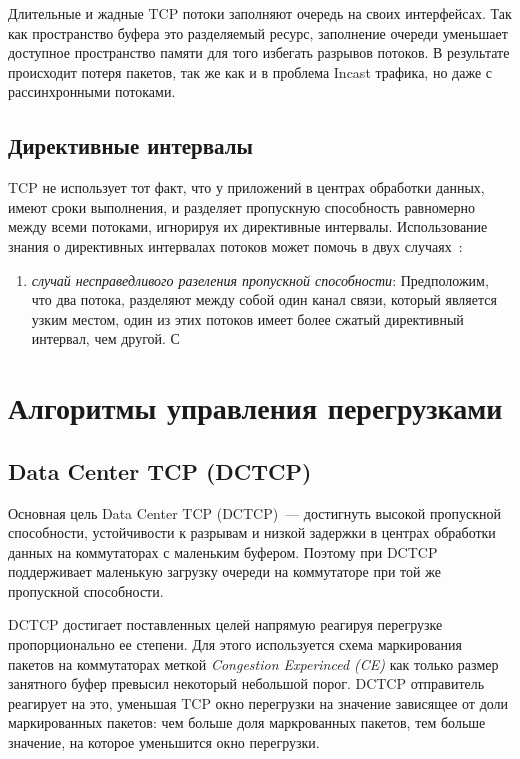 \documentclass[14pt, a4paper,oneside]{extarticle}
\begin{document}
Длительные и жадные TCP потоки заполняют очередь на своих интерфейсах. Так как пространство буфера это разделяемый ресурс, заполнение очереди уменьшает доступное пространство памяти для того избегать разрывов потоков. В результате происходит потеря пакетов, так же как и в проблема Incast трафика, но даже с рассинхронными потоками.
\newpage

\subsection{Директивные интервалы}

TCP не использует тот факт, что у приложений в центрах обработки данных, имеют сроки выполнения, и разделяет пропускную способность равномерно между всеми потоками, игнорируя их директивные интервалы. Использование знания о директивных интервалах потоков может помочь в двух случаях~\cite{d3tcp}:
\begin{enumerate}
\item \emph{случай несправедливого разеления пропускной способности}: 
Предположим, что два потока, разделяют между собой один канал связи, который является узким местом, один из этих потоков имеет более сжатый директивный интервал, чем другой. С
\end{enumerate}


\section{Алгоритмы управления перегрузками}
\subsection{Data Center TCP (DCTCP)}
Основная цель Data Center TCP (DCTCP)~--- достигнуть высокой пропускной способности, устойчивости к разрывам и низкой задержки в центрах обработки данных на коммутаторах с маленьким буфером. Поэтому при DCTCP поддерживает маленькую загрузку очереди на коммутаторе при той же пропускной способности.

DCTCP достигает поставленных целей напрямую реагируя перегрузке пропорционально ее степени. Для этого используется схема маркирования пакетов на коммутаторах меткой \emph{Congestion Experinced (CE)} как только размер занятного буфер превысил некоторый небольшой порог. DCTCP отправитель реагирует на это, уменьшая TCP окно перегрузки на значение зависящее от доли маркированных пакетов: чем больше доля маркрованных пакетов, тем больше значение, на которое уменьшится окно перегрузки.
\end{document}
